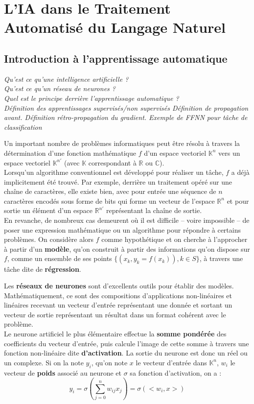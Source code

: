 \documentclass[12pt, french]{report}
\begin{document}
\section{L'IA dans le Traitement Automatisé du Langage Naturel}
\subsection{Introduction à l'apprentissage automatique}
\textit{Qu'est ce qu'une intelligence artificielle ?\\
    Qu'est ce qu'un réseau de neurones ?\\
    Quel est le principe derrière l'apprentissage automatique ?\\
    Définition des apprentissages supervisés/non supervisés
    Définition de propagation avant.
    Définition rétro-propagation du gradient.
    Exemple de FFNN pour tâche de classification}

Un important nombre de problèmes informatiques peut être résolu à travers la détermination d'une fonction mathématique $f$ d'un espace vectoriel $\mathbb{K}^n$ vers un espace vectoriel $\mathbb{K}^{n'}$ (avec $\mathbb{K}$ correspondant à $\mathbb{R}$ ou $\mathbb{C}$).\\
Lorsqu'un algorithme conventionnel est développé pour réaliser un tâche, $f$ a déjà implicitement été trouvé. Par exemple, derrière un traitement opéré sur une chaîne de caractères, elle existe bien, avec pour entrée une séquence de $n$ caractères encodés sous forme de bits qui forme un vecteur de l'espace $\mathbb{R}^n$ et pour sortie un élément d'un espace $\mathbb{R}^{n'}$ représentant la chaîne de sortie.\\
En revanche, de nombreux cas demeurent où il est difficile -- voire impossible -- de poser une expression mathématique ou un algorithme pour répondre à certains problèmes. On considère alors $f$ comme hypothétique et on cherche à l'approcher à partir d'un \textbf{modèle}, qu'on construit à partir des informations qu'on dispose sur $f$, comme un ensemble de ses points $\{(x_k, y_k=f(x_k)), k \in S\}$, à travers une tâche dite de \textbf{régression}.

\vspace{12pt}
Les \textbf{réseaux de neurones} sont d'excellents outils pour établir des modèles.
Mathématiquement, ce sont des compositions d'applications non-linéaires et linéaires
recevant un vecteur d'entrée représentant une donnée et sortant un vecteur de sortie
représentant un résultat dans un format cohérent avec le problème.\\
Le neurone artificiel le plus élémentaire effectue la \textbf{somme pondérée} des 
coefficients du vecteur d'entrée, puis calcule l'image de cette somme à travers
une fonction non-linéaire dite \textbf{d'activation}. La sortie du neurone est donc un réel ou un
complexe. Si on la note $y_i$, qu'on note $x$ le vecteur d'entrée dans $\mathbb{K}^n$,
$w_i$ le vecteur de \textbf{poids} associé au neurone et $\sigma$ sa fonction d'activation,
on a :
\begin{equation}
    y_i = \sigma(\sum_{j=0}^{n} w_{ij}x_j) = \sigma(<w_i, x>)
\end{equation}
\end{document}
